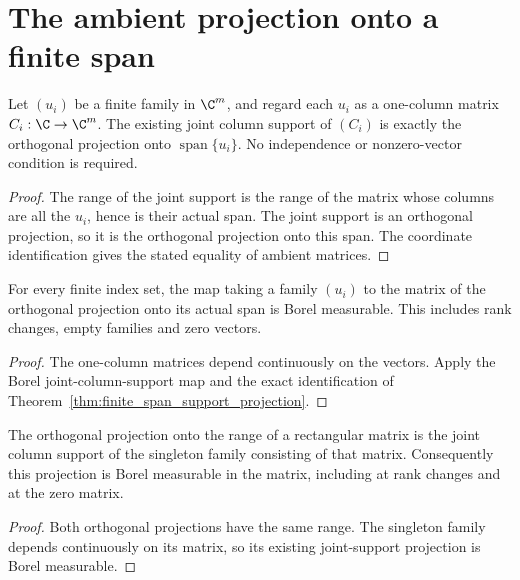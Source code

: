 \section{The ambient projection onto a finite span}

\begin{theorem}
    \label{thm:finite_span_support_projection}
    \leanok
    Let $(u_i)$ be a finite family in $\C^m$, and regard each $u_i$ as a
    one-column matrix $C_i:\C\to\C^m$. The existing joint column support
    of $(C_i)$ is exactly the orthogonal projection onto
    $\operatorname{span}\{u_i\}$. No independence or nonzero-vector
    condition is required.
\end{theorem}
\begin{proof}\leanok
    The range of the joint support is the range of the matrix whose
    columns are all the $u_i$, hence is their actual span. The joint support
    is an orthogonal projection, so it is the orthogonal projection onto
    this span. The coordinate identification gives the stated equality
    of ambient matrices.
\end{proof}

\begin{theorem}
    \label{thm:borel_finite_span_projection}
    \leanok
    For every finite index set, the map taking a family $(u_i)$ to the
    matrix of the orthogonal projection onto its actual span is Borel
    measurable. This includes rank changes, empty families and zero vectors.
\end{theorem}
\begin{proof}\leanok
    The one-column matrices depend continuously on the vectors. Apply
    the Borel joint-column-support map and the exact identification of
    Theorem~\ref{thm:finite_span_support_projection}.
\end{proof}


\begin{theorem}
    \label{thm:borel_arbitrary_matrix_range_projection}
    \leanok
    The orthogonal projection onto the range of a rectangular matrix is
    the joint column support of the singleton family consisting of that
    matrix. Consequently this projection is Borel measurable in the matrix,
    including at rank changes and at the zero matrix.
\end{theorem}
\begin{proof}\leanok
    Both orthogonal projections have the same range. The singleton family
    depends continuously on its matrix, so its existing joint-support
    projection is Borel measurable.
\end{proof}

